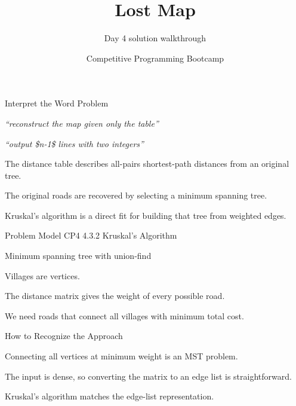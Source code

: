 \documentclass[aspectratio=169,11pt]{beamer}
\title[lostmap]{Lost Map}
\subtitle{Day 4 solution walkthrough}
\author[Solution Deck]{Competitive Programming Bootcamp}
\date{}
\begin{document}
\begin{frame}[plain]
  \titlepage
\end{frame}

\begin{frame}{Interpret the Word Problem}
\small
{}
\begin{tightitemize}
  \item \textit{``reconstruct the map given only the table''}
  \item \textit{``output \$n-1\$ lines with two integers''}
\end{tightitemize}

\vspace{0.18cm}
\begin{tightitemize}
  \item The distance table describes all-pairs shortest-path distances from an original tree.
  \item The original roads are recovered by selecting a minimum spanning tree.
  \item Kruskal's algorithm is a direct fit for building that tree from weighted edges.
\end{tightitemize}
\end{frame}







\begin{frame}{Problem Model}
\small
{} CP4 4.3.2 Kruskal's Algorithm

\vspace{0.25cm}
 Minimum spanning tree with union-find

\vspace{0.25cm}
\begin{tightitemize}
  \item Villages are vertices.
  \item The distance matrix gives the weight of every possible road.
  \item We need roads that connect all villages with minimum total cost.
\end{tightitemize}
\end{frame}

\begin{frame}{How to Recognize the Approach}
\begin{tightitemize}
  \item Connecting all vertices at minimum weight is an MST problem.
  \item The input is dense, so converting the matrix to an edge list is straightforward.
  \item Kruskal's algorithm matches the edge-list representation.
\end{tightitemize}
\end{frame}
\end{document}
